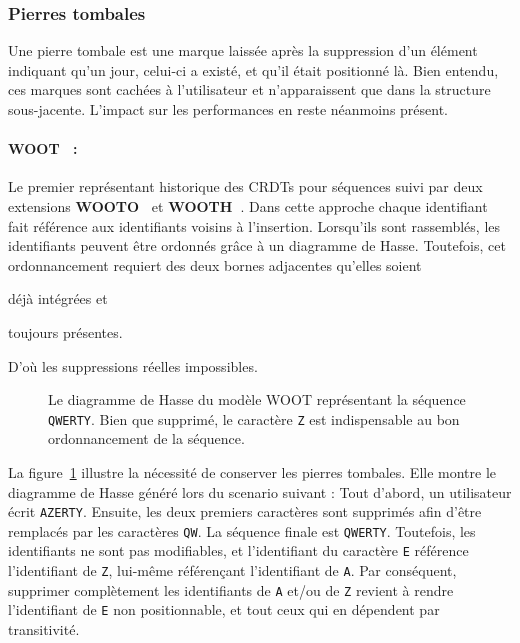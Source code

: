 \subsubsection{Pierres tombales}
\label{repl:subsubsec:tombstone}

Une pierre tombale est une marque laissée après la suppression d'un élément
indiquant qu'un jour, celui-ci a existé, et qu'il était positionné là. Bien
entendu, ces marques sont cachées à l'utilisateur et n'apparaissent que dans la
structure sous-jacente. L'impact sur les performances en reste néanmoins
présent.

\paragraph{WOOT~\cite{oster2006data} :} Le premier représentant historique des
CRDTs pour séquences suivi par deux extensions
\textbf{WOOTO~\cite{weiss2007wooki}} et
\textbf{WOOTH~\cite{ahmed2011evaluating}}. Dans cette approche chaque
identifiant fait référence aux identifiants voisins à l'insertion.  Lorsqu'ils
sont rassemblés, les identifiants peuvent être ordonnés grâce à un diagramme de
Hasse. Toutefois, cet ordonnancement requiert des deux bornes adjacentes
qu'elles soient
\begin{inparaenum}[(i)]
\item déjà intégrées et
\item toujours présentes.
\end{inparaenum}
D'où les suppressions réelles impossibles.

\begin{figure}
  \centering
  
  \caption{\label{repl:fig:wootexample}Le diagramme de Hasse du modèle WOOT
    représentant la séquence \texttt{QWERTY}. Bien que supprimé, le caractère
    \texttt{Z} est indispensable au bon ordonnancement de la séquence.}
\end{figure}

\noindent La figure~\ref{repl:fig:wootexample} illustre la nécessité de
conserver les pierres tombales. Elle montre le diagramme de Hasse généré lors du
scenario suivant : Tout d'abord, un utilisateur écrit \texttt{AZERTY}. Ensuite,
les deux premiers caractères sont supprimés afin d'être remplacés par les
caractères \texttt{QW}. La séquence finale est \texttt{QWERTY}. Toutefois, les
identifiants ne sont pas modifiables, et l'identifiant du caractère \texttt{E}
référence l'identifiant de \texttt{Z}, lui-même référençant l'identifiant de
\texttt{A}. Par conséquent, supprimer complètement les identifiants de
\texttt{A} et/ou de \texttt{Z} revient à rendre l'identifiant de \texttt{E} non
positionnable, et tout ceux qui en dépendent par transitivité.

